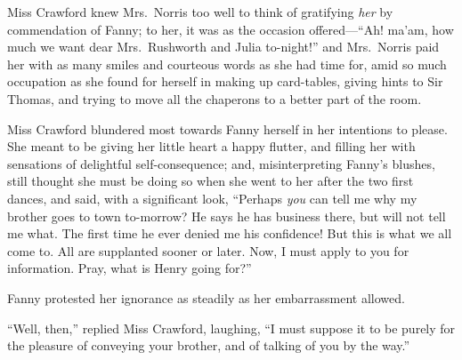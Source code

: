 Miss Crawford knew Mrs.\ Norris too well to think of
gratifying \emph{her} by commendation of Fanny; to her, it was
as the occasion offered---``Ah! ma'am, how much we want dear
Mrs.\ Rushworth and Julia to-night!'' and Mrs.\ Norris paid
her with as many smiles and courteous words as she had
time for, amid so much occupation as she found for herself
in making up card-tables, giving hints to Sir Thomas,
and trying to move all the chaperons to a better part of the room.

Miss Crawford blundered most towards Fanny herself in her
intentions to please.  She meant to be giving her little
heart a happy flutter, and filling her with sensations
of delightful self-consequence; and, misinterpreting Fanny's
blushes, still thought she must be doing so when she
went to her after the two first dances, and said, with a
significant look, ``Perhaps \emph{you} can tell me why my brother
goes to town to-morrow? He says he has business there,
but will not tell me what.  The first time he ever denied
me his confidence!  But this is what we all come to.
All are supplanted sooner or later.  Now, I must apply
to you for information.  Pray, what is Henry going for?''

Fanny protested her ignorance as steadily as her
embarrassment allowed.

``Well, then,'' replied Miss Crawford, laughing, ``I must
suppose it to be purely for the pleasure of conveying
your brother, and of talking of you by the way.''

